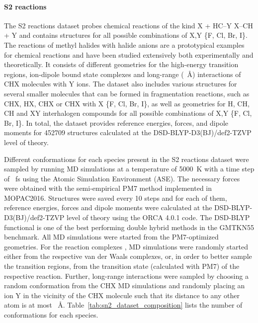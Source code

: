 \documentclass[12pt]{article}
\begin{document}
\paragraph{S2 reactions}
\label{sec:dataset_generation:sn2}
The S2 reactions dataset probes chemical reactions of the
kind X + HC--Y  X--CH + Y and
contains structures for all possible combinations of X,Y  \{F,
Cl, Br, I\}. The reactions of methyl halides with halide anions are a
prototypical examples for chemical reactions and have been studied
extensively both
experimentally\cite{tanaka1976gas,o1994measurements,li1996high,deturi1997translational,angel2003gas}
and
theoretically.\cite{deng1994potential,hu1995deuterium,glukhovtsev1996gas,lee2002high,liu2010steric,stei2016influence}
It consists of different geometries for the high-energy transition
regions, ion-dipole bound state complexes and long-range (~\AA)
interactions of CHX molecules with Y ions. The dataset also
includes various structures for several smaller molecules that can be
formed in fragmentation reactions, such as CHX, HX, CHX or
CHX with X  \{F, Cl, Br, I\}, as well as geometries for
H, CH, CH and XY interhalogen compounds for all possible
combinations of X,Y  \{F, Cl, Br, I\}. In total, the dataset
provides reference energies, forces, and dipole moments for
\num{452709} structures calculated at the DSD-BLYP-D3(BJ)/def2-TZVP
level of
theory.\cite{kozuch2010dsd,grimme2010consistent,grimme2011effect,weigend2005balanced}

Different conformations for each species present in the S2
reactions dataset were sampled by running MD simulations at a
temperature of \num{5000}~K with a time step of ~fs using the
Atomic Simulation Environment (ASE).\cite{larsen2017atomic} The
necessary forces were obtained with the semi-empirical PM7
method\cite{stewart2013optimization} implemented in
MOPAC2016.\cite{mopac2016} Structures were saved every \num{10} steps
and for each of them, reference energies, forces and dipole moments
were calculated at the
DSD-BLYP-D3(BJ)/def2-TZVP\cite{kozuch2010dsd,grimme2010consistent,grimme2011effect,weigend2005balanced}
level of theory using the ORCA 4.0.1
code.\cite{neese2012orca,neese2018software} The DSD-BLYP functional is
one of the best performing double hybrid methods in the GMTKN55
benchmark.\cite{goerigk2017look} All MD simulations were started from
the PM7-optimized geometries. For the reaction complexes
, MD simulations were randomly started
either from the respective van der Waals complexes, or, in order to
better sample the transition regions, from the transition state
(calculated with PM7) of the respective reaction. Further, long-range
interactions were sampled by choosing a random conformation from the
CHX MD simulations and randomly placing an ion Y in the
vicinity of the CHX molecule such that its distance to any other
atom is at most ~\AA. Table~\ref{tab:sn2_dataset_composition}
lists the number of conformations for each species.
\end{document}
